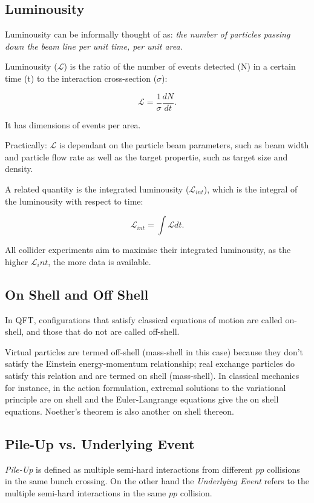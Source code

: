 \documentclass{article}
\begin{document}
\subsection{Luminousity}
Luminousity can be informally thought of as: \emph{the number of particles passing down the beam line per unit time, per unit area.}

Luminousity ($\mathcal{L}$) is the ratio of the number of events detected (N) in a certain time (t) to the interaction cross-section ($\sigma$):

\begin{equation}
\mathcal{L} = \frac{1}{\sigma}\frac{dN}{dt}.
\end{equation}

It has dimensions of events per area.

Practically: $\mathcal{L}$ is dependant on the particle beam parameters, such as beam width and particle flow rate as well as the target propertie, such as target size and density.

A related quantity is the integrated luminousity ($\mathcal{L}_{int}$), which is the integral of the luminousity with respect to time:

\begin{equation}
\mathcal{L}_{int} = \int \mathcal{L} dt.
\end{equation}

All collider experiments aim to maximise their integrated luminousity, as the higher $\mathcal{L}_i{nt}$, the more data is available.
\subsection{On Shell and Off Shell}
In QFT, configurations that satisfy classical equations of motion are called on-shell, and those that do not are called off-shell.

Virtual particles are termed off-shell (mass-shell in this case) because they don't satisfy the Einstein energy-momentum relationship; real exchange particles do satisfy this relation and are termed on shell (mass-shell). In classical mechanics for instance, in the action formulation, extremal solutions to the variational principle are on shell and the Euler-Langrange equations give the on shell equations. Noether's theorem is also another on shell thereon.

\subsection{Pile-Up vs. Underlying Event}
\emph{Pile-Up} is defined as multiple semi-hard interactions from different $pp$ collisions in the same bunch crossing. On the other hand the \emph{Underlying Event} refers to the multiple semi-hard interactions in the same $pp$ collision.
\end{document}
